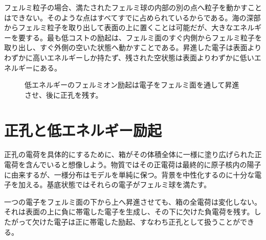 フェルミ粒子の場合、満たされたフェルミ球の内部の別の点へ粒子を動かすことはできない。そのような点はすべてすでに占められているからである。海の深部からフェルミ粒子を取り出して表面の上に置くことは可能だが、大きなエネルギーを要する。最も低コストの励起は、フェルミ面のすぐ内側からフェルミ粒子を取り出し、すぐ外側の空いた状態へ動かすことである。昇進した電子は表面よりわずかに高いエネルギーしか持たず、残された空状態は表面よりわずかに低いエネルギーにある。

\begin{figure}
\centering
{}
\caption{低エネルギーのフェルミオン励起は電子をフェルミ面を通して昇進させ、後に正孔を残す。}
\end{figure}

\section{正孔と低エネルギー励起}

正孔の電荷を具体的にするために、箱がその体積全体に一様に塗り広げられた正電荷を含んでいると想像しよう。物質ではその正電荷は最終的に原子核内の陽子に由来するが、一様分布はモデルを単純に保つ。背景を中性化するのに十分な電子を加える。基底状態ではそれらの電子がフェルミ球を満たす。

一つの電子をフェルミ面の下から上へ昇進させても、箱の全電荷は変化しない。それは表面の上に負に帯電した電子を生成し、その下に欠けた負電荷を残す。したがって欠けた電子は正に帯電した励起、すなわち正孔として扱うことができる。

\begin{classroomqa}
\end{classroomqa}

